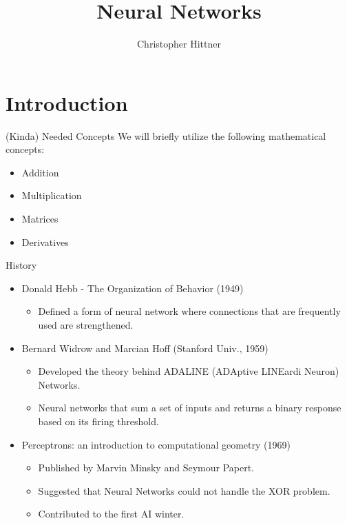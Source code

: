 \documentclass[11pt]{beamer}
\title{Neural Networks}
\author{Christopher Hittner}
\begin{document}
\maketitle
\section{Introduction}

\begin{frame}{(Kinda) Needed Concepts}
We will briefly utilize the following mathematical concepts:
\begin{itemize}
\item Addition
\item Multiplication
\item Matrices
\item Derivatives
\end{itemize}
\end{frame}

\begin{frame}{History}
\begin{itemize}
    \item Donald Hebb - The Organization of Behavior (1949)
    \begin{itemize}
        \item Defined a form of neural network where connections that are frequently used are strengthened.
    \end{itemize}
    \item Bernard Widrow and Marcian Hoff (Stanford Univ., 1959)
    \begin{itemize}
        \item Developed the theory behind ADALINE (ADAptive LINEardi Neuron) Networks.
        \item Neural networks that sum a set of inputs and returns a binary response based on its firing threshold.
    \end{itemize}
    \item Perceptrons: an introduction to computational geometry (1969)
    \begin{itemize}
        \item Published by Marvin Minsky and Seymour Papert.
        \item Suggested that Neural Networks could not handle the XOR problem.
        \item Contributed to the first AI winter.
    \end{itemize}
    \end{itemize}
\end{frame}
\end{document}
